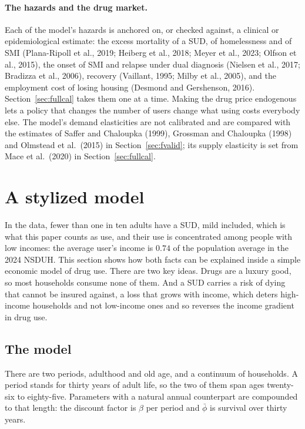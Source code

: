 \documentclass[10pt]{article}
\begin{document}
\paragraph{The hazards and the drug market.} Each of the model's hazards is anchored on, or checked against, a clinical or epidemiological estimate: the excess mortality of a SUD, of homelessness and of SMI (Plana-Ripoll et al., 2019; Heiberg et al., 2018; Meyer et al., 2023; Olfson et al., 2015), the onset of SMI and relapse under dual diagnosis (Nielsen et al., 2017; Bradizza et al., 2006), recovery (Vaillant, 1995; Milby et al., 2005), and the employment cost of losing housing (Desmond and Gershenson, 2016). Section~\ref{sec:fullcal} takes them one at a time. Making the drug price endogenous lets a policy that changes the number of users change what using costs everybody else. The model's demand elasticities are not calibrated and are compared with the estimates of Saffer and Chaloupka (1999), Grossman and Chaloupka (1998) and Olmstead et al.\ (2015) in Section~\ref{sec:fvalid}; its supply elasticity is set from Mace et al.\ (2020) in Section~\ref{sec:fullcal}.


\section{A stylized model}\label{sec:stylized}

In the data, fewer than one in ten adults have a SUD, mild included, which is what this paper counts as use, and their use is concentrated among people with low incomes: the average user's income is $0.74$ of the population average in the 2024 NSDUH. This section shows how both facts can be explained inside a simple economic model of drug use. There are two key ideas. Drugs are a luxury good, so most households consume none of them. And a SUD carries a risk of dying that cannot be insured against, a loss that grows with income, which deters high-income households and not low-income ones and so reverses the income gradient in drug use.

\subsection{The model}\label{sec:env}

There are two periods, adulthood and old age, and a continuum of households. A period stands for
thirty years of adult life, so the two of them span ages twenty-six to eighty-five.
Parameters with a natural annual counterpart are compounded to that length: the
discount factor is $\beta$ per period and $\bar\phi$ is survival over thirty years.
\end{document}
